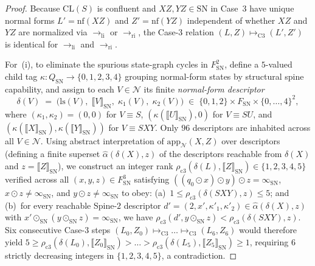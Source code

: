 \documentclass[11pt,reqno]{amsart}
\numberwithin{equation}{section}
\theoremstyle{plain}
\theoremstyle{definition}
\theoremstyle{remark}
\begin{document}
\begin{proof}
Because $\mathrm{CL}(S)$ is confluent and $X Z, Y Z \in \mathrm{SN}$ in Case~3 have unique normal forms $L' = \mathrm{nf}(X Z)$ and $Z' = \mathrm{nf}(Y Z)$ independent of whether $X Z$ and $Y Z$ are normalized via $\to_{\mathrm{li}}$ or $\to_{\mathrm{ri}}$, the Case-3 relation $(L, Z) \mapsto_{\mathrm{C3}} (L', Z')$ is identical for $\to_{\mathrm{li}}$ and $\to_{\mathrm{ri}}$.

For~(i), to eliminate the spurious state-graph cycles in $F_{\mathrm{SN}}^2$, define a $5$-valued child tag $\kappa : Q_{\mathrm{SN}} \to \{0, 1, 2, 3, 4\}$ grouping normal-form states by structural spine capability, and assign to each $V \in \mathcal{N}$ its finite \emph{normal-form descriptor}
\[
\delta(V) \;=\; \bigl(\mathrm{ls}(V),\; \llbracket V \rrbracket_{\mathrm{SN}},\; \kappa_1(V),\; \kappa_2(V)\bigr)
\;\in\; \{0, 1, 2\} \times F_{\mathrm{SN}} \times \{0, \dots, 4\}^2,
\]
where $(\kappa_1, \kappa_2) = (0, 0)$ for $V \equiv S$, $(\kappa(\llbracket U \rrbracket_{\mathrm{SN}}), 0)$ for $V \equiv S U$, and $(\kappa(\llbracket X \rrbracket_{\mathrm{SN}}), \kappa(\llbracket Y \rrbracket_{\mathrm{SN}}))$ for $V \equiv S X Y$. Only $96$ descriptors are inhabited across all $V \in \mathcal{N}$. Using abstract interpretation of $\mathrm{app}_{\mathcal{N}}(X, Z)$ over descriptors (defining a finite superset $\hat{\alpha}(\delta(X), z)$ of the descriptors reachable from $\delta(X)$ and $z = \llbracket Z \rrbracket_{\mathrm{SN}}$), we construct an integer rank $\rho_{\mathrm{c3}}(\delta(L), \llbracket Z \rrbracket_{\mathrm{SN}}) \in \{1, 2, 3, 4, 5\}$ verified across all $(x, y, z) \in F_{\mathrm{SN}}^3$ satisfying $((q_0 \odot x) \odot y) \odot z = \infty_{\mathrm{SN}}$, $x \odot z \neq \infty_{\mathrm{SN}}$, and $y \odot z \neq \infty_{\mathrm{SN}}$ to obey: (a)~$1 \le \rho_{\mathrm{c3}}(\delta(S X Y), z) \le 5$; and (b)~for every reachable Spine-$2$ descriptor $d' = (2, x', \kappa'_1, \kappa'_2) \in \hat{\alpha}(\delta(X), z)$ with $x' \odot_{\mathrm{SN}} (y \odot_{\mathrm{SN}} z) = \infty_{\mathrm{SN}}$, we have $\rho_{\mathrm{c3}}(d', y \odot_{\mathrm{SN}} z) < \rho_{\mathrm{c3}}(\delta(S X Y), z)$. Six consecutive Case-3 steps $(L_0, Z_0) \mapsto_{\mathrm{C3}} \dots \mapsto_{\mathrm{C3}} (L_6, Z_6)$ would therefore yield $5 \ge \rho_{\mathrm{c3}}(\delta(L_0), \llbracket Z_0 \rrbracket_{\mathrm{SN}}) > \dots > \rho_{\mathrm{c3}}(\delta(L_5), \llbracket Z_5 \rrbracket_{\mathrm{SN}}) \ge 1$, requiring $6$ strictly decreasing integers in $\{1, 2, 3, 4, 5\}$, a contradiction.


\end{proof}
\end{document}
